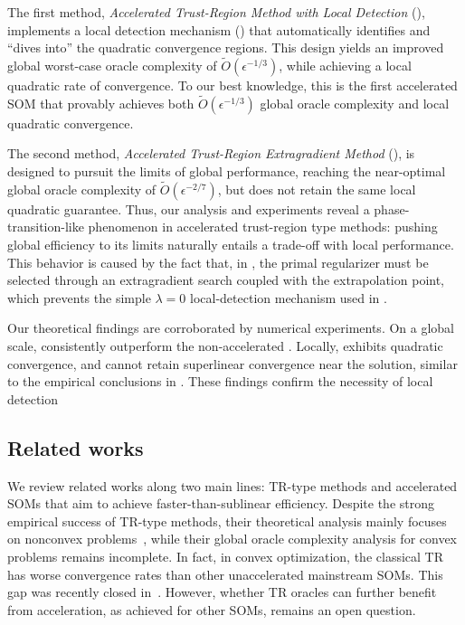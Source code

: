 \documentclass[moor,sglanonrev]{informs4}
\begin{document}
The first method, \emph{Accelerated Trust-Region Method with Local Detection} (), implements a local detection mechanism () that automatically identifies and ``dives into'' the quadratic convergence regions. This design yields an improved global worst-case oracle complexity of $\tilde{O}(\epsilon^{-1/3})$, while achieving a local quadratic rate of convergence. To our best knowledge, this is the first accelerated SOM that provably achieves both $\tilde{O}(\epsilon^{-1/3})$ global oracle complexity and local quadratic convergence.

The second method, \emph{Accelerated Trust-Region Extragradient Method} (), is designed to pursuit the limits of global performance, reaching the near-optimal global oracle complexity of $\tilde{O}(\epsilon^{-2/7})$, but does not retain the same local quadratic guarantee. Thus, our analysis and experiments reveal a phase-transition-like phenomenon in accelerated trust-region type methods: pushing global efficiency to its limits naturally entails a trade-off with local performance.
This behavior is caused by the fact that, in , the primal regularizer must be selected through an extragradient search coupled with the extrapolation point, which prevents the simple $\lambda=0$ local-detection mechanism used in .

Our theoretical findings are corroborated by numerical experiments. On a global scale,  consistently outperform the non-accelerated . Locally,  exhibits quadratic convergence, and \atrms{} cannot retain superlinear convergence near the solution, similar to the empirical conclusions in \cite{carmon2022optimal,jiang2024accelerated,huang2024inexact}. These findings confirm the necessity of local detection 

\subsection{Related works}
We review related works along two main lines: TR-type methods and accelerated SOMs that aim to achieve faster-than-sublinear efficiency. Despite the strong empirical success of TR-type methods, their theoretical analysis mainly focuses on nonconvex problems~\cite{ye2005second,curtis2017trust,curtis2021trust,zhang2025homogeneous,hamad2022consistently,grapiglia2015on,hamad2024simple,curtis2023worst_i,ouyang2025trust}, while their global oracle complexity analysis for convex problems remains incomplete.
In fact, in convex optimization, the classical TR has worse convergence rates than other unaccelerated mainstream SOMs. This gap was recently closed in~\cite{jiang2026beyond}. However, whether TR oracles can further benefit from acceleration, as achieved for other SOMs, remains an open question.
\end{document}
